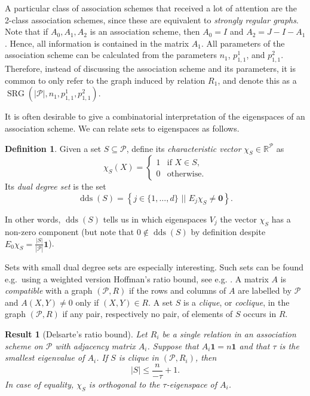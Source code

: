 \documentclass[a4paper]{article}
\newtheorem{res}[thm]{Result}
\theoremstyle{definition}
\newtheorem{df}[thm]{Definition}
\newcommand{\RR}{\mathbb R}
\newcommand{\sett}[2]{ \left\{ #1 \, \, || \, \, #2 \right \} }
\newcommand{\one}{\mathbf 1}
\newcommand{\zero}{\mathbf 0}
\newcommand{\pp}{\mathcal P}
\DeclareMathOperator{\SRG}{SRG}
\DeclareMathOperator{\dds}{dds}
\begin{document}
\bigskip

A particular class of association schemes that received a lot of attention are the 2-class association schemes, since these are equivalent to  \emph{strongly regular graphs}.
Note that if $A_0, A_1, A_2$ is an association scheme, then $A_0 = I$ and $A_2 = J - I  - A_1$.
Hence, all information is contained in the matrix $A_1$.
All parameters of the association scheme can be calculated from the parameters $n_1$, $p^1_{1,1}$, and $p^2_{1,1}$.
Therefore, instead of discussing the association scheme and its parameters, it is common to only refer to the graph induced by relation $R_1$, and denote this as a $\SRG(|\pp|,n_1,p^1_{1,1},p^2_{1,1})$.

\bigskip

It is often desirable to give a combinatorial interpretation of the eigenspaces of an association scheme.
We can relate sets to eigenspaces as follows.

\begin{df}
 Given a set $S \subseteq \pp$, define its \emph{characteristic vector} $\chi_S \in \RR^\pp$ as
 \[
  \chi_S(X) = \begin{cases}
   1 &\text{if } X \in S, \\
   0 &\text{otherwise.}
  \end{cases}
 \]
 Its \emph{dual degree set} is the set
 \[
  \dds(S) = \sett{j \in \{1,\dots,d\}}{ E_j \chi_S \neq \zero}.
 \]
\end{df}

In other words, $\dds(S)$ tells us in which eigenspaces $V_j$ the vector $\chi_S$ has a non-zero component (but note that $0 \notin \dds(S)$ by definition despite $E_0 \chi_S = \frac{|S|}{|\pp|} \one$).

Sets with small dual degree sets are especially interesting.
Such sets can be found e.g.\ using a weighted version Hoffman's ratio bound, see e.g. \cite[Theorem 2.4.2]{godsilmeagher}.
A matrix $A$ is \emph{compatible} with a graph $(\pp,R)$ if the rows and columns of $A$ are labelled by $\pp$ and $A(X,Y) \neq 0$ only if $(X,Y) \in R$.
A set $S$ is a \emph{clique}, or \emph{coclique}, in the graph $(\pp,R)$ if any pair, respectively no pair, of elements of $S$ occurs in $R$.

\begin{res}[Delsarte's ratio bound]
 \label{Res:Delsarte}
 Let $R_i$ be a single relation in an association scheme on $\pp$ with adjacency matrix $A_i$.
 Suppose that $A_i \one = n \one$ and that $\tau$ is the smallest eigenvalue of $A_i$.
 If $S$ is clique in $(\pp,R_i)$, then
 \[
  |S| \leq \frac n{-\tau} + 1.
 \]
 In case of equality, $\chi_S$ is orthogonal to the $\tau$-eigenspace of $A_i$.
\end{res}
\end{document}
